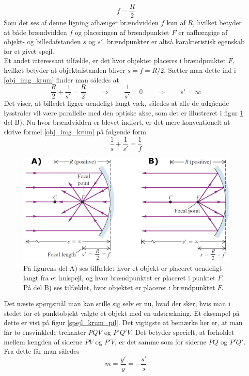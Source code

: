 \begin{equation}
f = \frac{R}{2}
\label{focal_point_eq}
\end{equation} 
Som det ses af denne ligning afhænger brændvidden $f$ kun af $R$, hvilket betyder at både brændvidden $f$ og placeringen af brændpunktet $F$ er uafhængige af objekt- og billedafstanden $s$ og $s'$. brændpunkter er altså karakteristisk egenskab for et givet spejl.\\
Et andet interessant tilfælde, er det hvor objektet placeres i brændpunktet $F$, hvilket betyder at objektafstanden bliver $s = f = R/2$. Sætter man dette ind i \eqref{obj_img_krum} finder man således at
$$\frac{R}{2} + \frac{1}{s'} = \frac{R}{2} \quad \quad \Rightarrow \quad \quad \frac{1}{s'} = 0 \quad \quad \Rightarrow \quad \quad s' = \infty$$
Det viser, at billedet ligger uendeligt langt væk, således at alle de udgående lysstråler vil være parallelle med den optiske akse, som det er illustreret i figur \ref{focal_point_12} del B). Nu hvor brændvidden er blevet indført, er det mere konventionelt at skrive formel \eqref{obj_img_krum} på følgende form
\begin{equation}
\frac{1}{s} + \frac{1}{s'} = \frac{1}{f}
\label{ny_focal_s_s'}
\end{equation}

\begin{figure}[h!]
	\centering
	\includegraphics[scale=0.24]{Geometrisk-Optik/focal_point_12.PNG}
	\caption{På figurens del A) ses tilfældet hvor et objekt er placeret uendeligt langt fra et hulspejl, og hvor brændpunktet er placeret i punktet $F$. På del B) ses tilfældet, hvor objektet er placeret i brændpunktet $F$.}
	\label{focal_point_12}
\end{figure}
Det næste spørgsmål man kan stille sig selv er nu, hvad der sker, hvis man i stedet for et punktobjekt valgte et objekt med en udstrækning. Et eksempel på dette er vist på figur \ref{spejl_krum_pil}. Det vigtigste at bemærke her er, at man får to ensvinklede trekanter $PQV$ og $P'Q'V$. Det betyder specielt, at forholdet mellem længden af siderne $PV$ og $P'V$, er det samme som for siderne $PQ$ og $P'Q'$. Fra dette får man således
\begin{equation}
m = \frac{y'}{y} = - \frac{s'}{s}
\end{equation}


